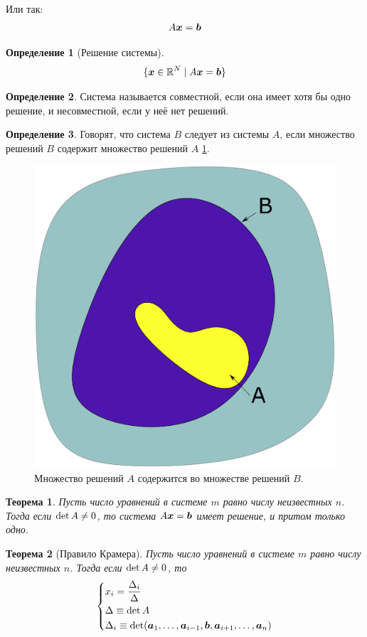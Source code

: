 \documentclass[a4paper,12pt]{article}
\newtheorem{theorem}{Теорема}[section]
\theoremstyle{definition}
\newtheorem{definition}{Определение}[section]
\theoremstyle{remark}
\theoremstyle{remark}
\theoremstyle{remark}
\begin{document}
  Или так:
  \[
    A \boldsymbol x = \boldsymbol b
  \]
  
  \begin{definition}[Решение системы]
    \[
      \{\boldsymbol x \in \operatorname{\mathbb R}^N \mid A \boldsymbol x = \boldsymbol b\}
    \]
  \end{definition}
  
  \begin{definition}
    Система называется совместной, если она имеет хотя бы одно решение, и несовместной, если у неё нет решений.
  \end{definition}
  
  \begin{definition}
    Говорят, что система $B$ следует из системы $A$, если множество решений $B$ содержит множество решений $A$ \ref{fig:a-and-b-sets}.
  \end{definition}
  
  \begin{figure}[h]
    \centering
    
    \includegraphics[width=0.5\columnwidth]{a-and-b-sets}
    
    \caption{Множество решений $A$ содержится во множестве решений $B$.}
    \label{fig:a-and-b-sets}
  \end{figure}
  
  \begin{theorem}
    Пусть число уравнений в системе $m$ равно числу неизвестных $n$.
    Тогда если $\det A \hm{\not=} 0$, то система $A \bds x \hm= \bds b$ имеет решение, и притом только одно.
  \end{theorem}
  
  \begin{theorem}[Правило Крамера]
    Пусть число уравнений в системе $m$ равно числу неизвестных $n$.
    Тогда если $\det A \hm{\not=} 0$, то
    \[
      \left\{
        \begin{aligned}
          &x_i = \frac{\Delta_i}{\Delta}\\
          &\Delta \equiv \det A\\
          &\Delta_i \equiv \det (\boldsymbol a_1, \ldots, \boldsymbol a_{i - 1}, \boldsymbol b, \boldsymbol a_{i + 1}, \ldots, \boldsymbol a_n)
        \end{aligned}
      \right.
    \]
  \end{theorem}
  
\end{document}
